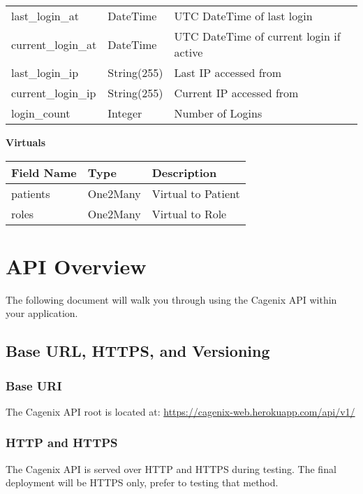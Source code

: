 \documentclass[letterpaper,10pt,english]{sphinxmanual}
\begin{document}
\begin{tabulary}{\linewidth}{|L|L|L|}
last\_login\_at
 & 
DateTime
 & 
UTC DateTime of last login
\\

current\_login\_at
 & 
DateTime
 & 
UTC DateTime of current login if active
\\

last\_login\_ip
 & 
String(255)
 & 
Last IP accessed from
\\

current\_login\_ip
 & 
String(255)
 & 
Current IP accessed from
\\

login\_count
 & 
Integer
 & 
Number of Logins
\\
\hline\end{tabulary}


\textbf{Virtuals}

\begin{tabulary}{\linewidth}{|L|L|L|}
\hline
\textsf{\relax 
Field Name
} & \textsf{\relax 
Type
} & \textsf{\relax 
Description
}\\
\hline
patients
 & 
One2Many
 & 
Virtual to Patient
\\

roles
 & 
One2Many
 & 
Virtual to Role
\\
\hline\end{tabulary}



\chapter{API Overview}
\label{dev-api-overview:api-overview}\label{dev-api-overview::doc}
The following document will walk you through using the Cagenix API
within your application.


\section{Base URL, HTTPS, and Versioning}
\label{dev-api-overview:base-url-https-and-versioning}

\subsection{Base URI}
\label{dev-api-overview:base-uri}
The Cagenix API root is located at:
\href{https://cagenix-web.herokuapp.com/api/v1/}{https://cagenix-web.herokuapp.com/api/v1/}


\subsection{HTTP and HTTPS}
\label{dev-api-overview:http-and-https}
The Cagenix API is served over HTTP and HTTPS during testing. The final
deployment will be HTTPS only, prefer to testing that method.
\end{document}
